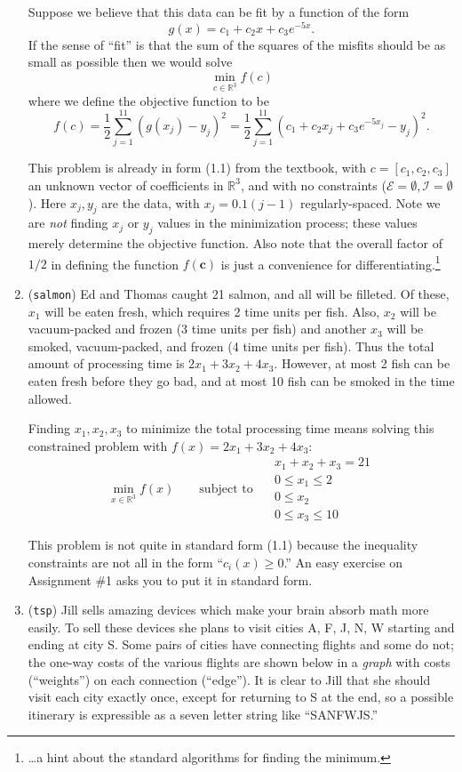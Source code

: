 \documentclass[11pt]{amsart}
\newcommand{\bc}{\mathbf{c}}
\newcommand{\RR}{\mathbb{R}}
\begin{document}
\begin{enumerate}
\medskip
Suppose we believe that this data can be fit by a function of the form
	$$g(x) = c_1 + c_2 x + c_3 e^{-5 x}.$$
If the sense of ``fit'' is that the sum of the squares of the misfits should be as small as possible then we would solve
	$$\min_{c \in \RR^3} f(c)$$
where we define the objective function to be
	$$f(c) = \frac{1}{2} \sum_{j=1}^{11} \left(g(x_j) - y_j\right)^2 = \frac{1}{2} \sum_{j=1}^{11} \left(c_1 + c_2 x_j + c_3 e^{-5 x_j} - y_j\right)^2.$$

This problem is already in form (1.1) from the textbook, with $c = \left[c_1,c_2,c_3\right]$ an unknown vector of coefficients in $\RR^3$, and with no constraints ($\mathcal{E}=\emptyset,\mathcal{I}=\emptyset$).  Here $x_j,y_j$ are the data, with $x_j = 0.1 (j-1)$ regularly-spaced.  Note we are \emph{not} finding $x_j$ or $y_j$ values in the minimization process; these values merely determine the objective function.  Also note that the overall factor of $1/2$ in defining the function $f(\bc)$ is just a convenience for differentiating.\footnote{\dots a hint about the standard algorithms for finding the minimum.}

\medskip
\item (\texttt{salmon})  \quad Ed and Thomas caught 21 salmon, and all will be filleted.  Of these, $x_1$ will be eaten fresh, which requires 2 time units per fish.  Also, $x_2$ will be vacuum-packed and frozen (3 time units per fish) and another $x_3$ will be smoked, vacuum-packed, and frozen (4 time units per fish).  Thus the total amount of processing time is $2 x_1 + 3 x_2 + 4 x_3$.  However, at most 2 fish can be eaten fresh before they go bad, and at most 10 fish can be smoked in the time allowed.

Finding $x_1,x_2,x_3$ to minimize the total processing time means solving this constrained problem with $f(x) = 2 x_1 + 3 x_2 + 4 x_3$:
	$$\min_{x\in\RR^3} f(x) \qquad \text{subject to }\quad \begin{matrix} x_1 + x_2 + x_3 = 21 \\ 0 \le x_1 \le 2 \\ 0 \le x_2 \\ 0 \le x_3 \le 10 \end{matrix}$$

This problem is not quite in standard form (1.1) because the inequality constraints are not all in the form ``$c_i(x) \ge 0$.''  An easy exercise on Assignment \#1 asks you to put it in standard form.

\medskip
\item (\texttt{tsp})  \quad Jill sells amazing devices which make your brain absorb math more easily.  To sell these devices she plans to visit cities A, F, J, N, W starting and ending at city S.  Some pairs of cities have connecting flights and some do not; the one-way costs of the various flights are shown below in a \emph{graph} with costs (``weights'') on each connection (``edge'').  It is clear to Jill that she should visit each city exactly once, except for returning to S at the end, so a possible itinerary is expressible as a seven letter string like ``SANFWJS.''


\end{enumerate}
\end{document}
